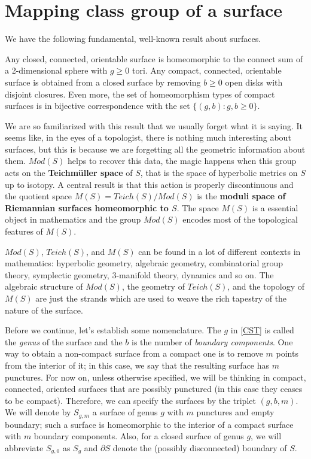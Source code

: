\section{Mapping class group of a surface}

We have the following fundamental, well-known result about surfaces.

\begin{theorem}\label{CST}
Any closed, connected, orientable surface is homeomorphic to the connect sum of a 2-dimensional sphere with $g \geq 0$ tori. Any compact, connected, orientable surface is obtained from a closed surface by removing $b \geq 0 $ open disks with disjoint closures. Even more, the set of homeomorphism types of compact surfaces is in bijective correspondence with the set $\{ (g, b) : g, b \geq 0\}$.
\end{theorem}

We are so familiarized with this result that we usually forget what it is saying. It seems like, in the eyes of a topologist, there is nothing much interesting about surfaces, but this is because we are forgetting all the geometric information about them. $Mod(S)$ helps to recover this data, the magic happens when this group acts on the \textbf{Teichmüller space} of $S$, that is the space of hyperbolic metrics on $S$ up to isotopy. A central result is that this action is properly discontinuous and the quotient space $M(S) = Teich(S)/ Mod(S)$ is the \textbf{moduli space of Riemannian surfaces homeomorphic to $S$}. The space $M(S)$ is a essential object in mathematics and the group $Mod(S)$ encodes most of the topological features of $M(S)$.

$Mod(S)$, $Teich(S)$, and $M(S)$ can be found in a lot of different contexts in mathematics: hyperbolic geometry, algebraic geometry, combinatorial group theory, symplectic geometry, 3-manifold theory, dynamics and so on. The algebraic structure of $Mod(S)$, the geometry of $Teich(S)$, and the topology of $M(S)$ are just the strands which are used to weave the rich tapestry of the nature of the surface.

Before we continue, let's establish some nomenclature. The $g$ in \ref{CST} is called the \textit{genus} of the surface and the $b$ is the number of \textit{boundary components}. One way to obtain a non-compact surface from a compact one is to remove $m$ points from the interior of it; in this case, we say that the resulting surface has $m$ punctures. For now on, unless otherwise specified, we will be thinking in compact, connected, oriented surfaces that are possibly punctured (in this case they ceases to be compact). Therefore, we can specify the surfaces by the triplet $(g, b, m)$. We will denote by $S_{g,m}$ a surface of genus $g$ with $m$ punctures and empty boundary; such a surface is homeomorphic to the interior of a compact surface with $m$ boundary components. Also, for a closed surface of genus $g$, we will abbreviate $S_{g,0}$ as $S_{g}$ and $\partial S$ denote the (possibly disconnected) boundary of $S$.

